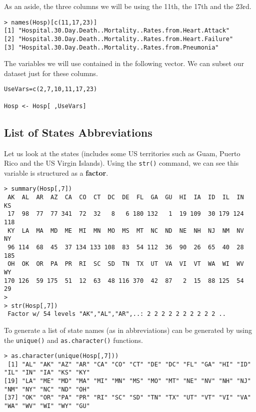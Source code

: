 \documentclass[]{article}
\begin{document}
As an aside, the three columns we will be using the 11th, the 17th and the 23rd.

\begin{verbatim}
> names(Hosp)[c(11,17,23)]
[1] "Hospital.30.Day.Death..Mortality..Rates.from.Heart.Attack" 
[2] "Hospital.30.Day.Death..Mortality..Rates.from.Heart.Failure"
[3] "Hospital.30.Day.Death..Mortality..Rates.from.Pneumonia" 
\end{verbatim}

The variables we will use contained in the following vector. We can subset our dataset just for these columns.

\begin{framed}
\begin{verbatim}
UseVars=c(2,7,10,11,17,23)

Hosp <- Hosp[ ,UseVars]
\end{verbatim}
\end{framed}

\newpage
\subsection{List of States Abbreviations}
\noindent Let us look at the states (includes some US territories such as Guam, Puerto Rico and the US Virgin Islands). Using the \texttt{str()} command, we can see this variable is structured as a \textbf{factor}.
\begin{verbatim}
> summary(Hosp[,7])
 AK  AL  AR  AZ  CA  CO  CT  DC  DE  FL  GA  GU  HI  IA  ID  IL  IN  KS 
 17  98  77  77 341  72  32   8   6 180 132   1  19 109  30 179 124 118 
 KY  LA  MA  MD  ME  MI  MN  MO  MS  MT  NC  ND  NE  NH  NJ  NM  NV  NY 
 96 114  68  45  37 134 133 108  83  54 112  36  90  26  65  40  28 185 
 OH  OK  OR  PA  PR  RI  SC  SD  TN  TX  UT  VA  VI  VT  WA  WI  WV  WY 
170 126  59 175  51  12  63  48 116 370  42  87   2  15  88 125  54  29
>
> str(Hosp[,7])
 Factor w/ 54 levels "AK","AL","AR",..: 2 2 2 2 2 2 2 2 2 2 ..
\end{verbatim}

To generate a list of state names (as in abbreviations) can be generated by using the \texttt{unique()} and \texttt{as.character()} functions.
\begin{verbatim}
> as.character(unique(Hosp[,7]))
 [1] "AL" "AK" "AZ" "AR" "CA" "CO" "CT" "DE" "DC" "FL" "GA" "HI" "ID" "IL" "IN" "IA" "KS" "KY"
[19] "LA" "ME" "MD" "MA" "MI" "MN" "MS" "MO" "MT" "NE" "NV" "NH" "NJ" "NM" "NY" "NC" "ND" "OH"
[37] "OK" "OR" "PA" "PR" "RI" "SC" "SD" "TN" "TX" "UT" "VT" "VI" "VA" "WA" "WV" "WI" "WY" "GU"
\end{verbatim}
\end{document}
